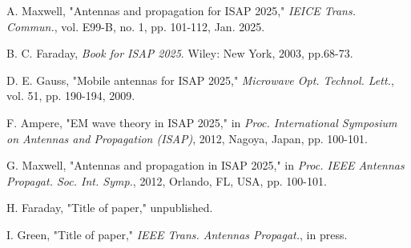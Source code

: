 \documentclass[conference,a4paper]{isap2025}
\begin{document}
\begin{thebibliography}{00}
A. Maxwell, 
"Antennas and propagation for ISAP 2025," 
{\it IEICE Trans. Commun.}, 
vol. E99-B, no. 1, pp. 101-112, Jan. 2025.

B. C. Faraday, 
{\it Book for ISAP 2025}.  
Wiley: New York, 2003, pp.68-73.

D. E. Gauss, 
"Mobile antennas for ISAP 2025," 
{\it Microwave Opt. Technol. Lett.},
vol. 51, pp. 190-194, 2009.

F. Ampere, 
"EM wave theory in ISAP 2025," 
in {\it Proc. International Symposium on Antennas and Propagation (ISAP)}, 2012, 
Nagoya, Japan, pp. 100-101.

G. Maxwell, 
"Antennas and propagation in ISAP 2025," 
in {\it Proc. IEEE Antennas Propagat. Soc. Int. Symp.}, 2012, 
Orlando, FL, USA, pp. 100-101.

H. Faraday, 
"Title of paper," 
unpublished.

I. Green, 
"Title of paper," 
{\it IEEE Trans. Antennas Propagat.},
in press. 
\end{thebibliography}
\end{document}
